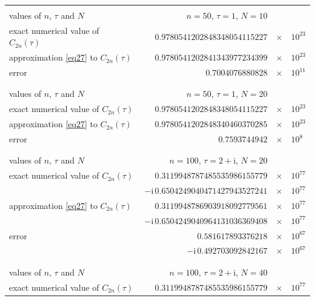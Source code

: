 \documentclass[pdftex]{sigma}
\def\im{\mathrm{i}}
\numberwithin{equation}{section}
\begin{document}
\begin{table}[!ht]\centering
\begin{tabular}
[c]{ l r @{\,}c@{\,} l}\hline
 & \\ [-1.5ex]
 values of $n$, $\tau$ and $N$ & $n=50$, $\tau=1$, $N=10$ & & \\ [0.5ex]
 exact numerical value of $C_{2n}(\tau)\qquad$ & $0.9780541202848348054115227$ & $\times$ & $10^{23}$ \\ [0.5ex]
 approximation \eqref{eq27} to $C_{2n}(\tau)$ & $0.9780541202841343977234399$ & $\times$ & $10^{23}$ \\ [0.5ex]
 error & $0.7004076880828$ & $\times$ & $10^{11}$\\ [-1.25ex]
 & \\\hline
& \\ [-1.5ex]
 values of $n$, $\tau$ and $N$ & $n=50$, $\tau=1$, $N=20$ & & \\ [0.5ex]
 exact numerical value of $C_{2n}(\tau)$ & $0.9780541202848348054115227$ & $\times$ & $10^{23}$ \\ [0.5ex]
 approximation \eqref{eq27} to $C_{2n}(\tau)$ & $0.9780541202848340460370285$ & $\times$ & $10^{23}$ \\ [0.5ex]
 error & $0.7593744942$ & $\times$ & $10^{8}$\\ [-1.5ex]
 & \\\hline
& \\ [-1.5ex]
 values of $n$, $\tau$ and $N$ & $n=100$, $\tau=2+\im$, $N=20$ & & \\ [0.5ex]
 exact numerical value of $C_{2n}(\tau)$ & $0.3119948787485535986155779$ & $\times$ & $10^{77}$ \\ [0.1ex]
 & $-\im\, 0.6504249040471427943527241$ & $\times$ & $10^{77}$ \\ [0.5ex]
 approximation \eqref{eq27} to $C_{2n}(\tau)$ & $0.3119948786903918092779561$ & $\times$ & $10^{77}$ \\ [0.1ex]
 & $-\im\, 0.6504249040964131036369408$ & $\times$ & $10^{77}$ \\ [0.5ex]
 error & $0.581617893376218$ & $\times$ & $10^{67}$\\ [0.1ex]
& $-\im\, 0.492703092842167$ & $\times$ & $10^{67}$ \\ [-1.5ex]
 & \\\hline
& \\ [-1.5ex]
 values of $n$, $\tau$ and $N$ & $n=100$, $\tau=2+\im$, $N=40$ & & \\ [0.5ex]
 exact numerical value of $C_{2n}(\tau)$ & $0.3119948787485535986155779$ & $\times$ & $10^{77}$ \\ [0.1ex]

\end{tabular}
\end{table}
\end{document}
